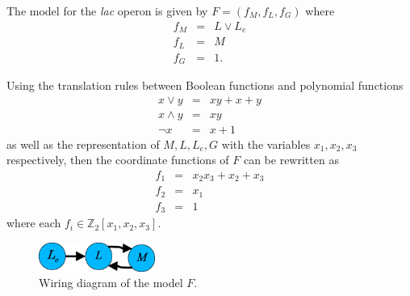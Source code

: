 \documentclass{amsart}
\theoremstyle{definition}
\theoremstyle{remark}
\theoremstyle{example}
\theoremstyle{conjecture}
\numberwithin{equation}{section}
\newcommand{\lac}{\textit{lac }}
\begin{document}
The model for the \lac operon  is given by $F = (f_M , f_L , f_G)$
where
\begin{eqnarray*}
  f_M &=& L \lor L_e \\
  f_L &=& M \\
  f_G &=& 1.
\end{eqnarray*}

Using the translation rules between Boolean functions and polynomial
functions
%
\begin{eqnarray*}
  x\lor y &=& xy+x+y \\
  x\land y &=& xy \\
  \lnot x &=& x+1
\end{eqnarray*}
%
as well as the representation of $M, L, L_e, G$ with the variables
$x_1,x_2,x_3$ respectively, then the coordinate functions of $F$ can
be rewritten as
%
\begin{eqnarray}
\label{model}
 \nonumber %
  f_1 &=& x_2x_3+x_2+x_3 \\
  f_2 &=& x_1 \\
  \nonumber f_3 &=& 1
\end{eqnarray}
%
where each $f_i\in \mathbb Z_2[x_1,x_2,x_3]$.



\begin{figure}
  \centering
	 \includegraphics[width=1.5in]{wiring-diagram.eps}
  \caption{Wiring diagram of the model $F$.}\label{}
\end{figure}
\end{document}

